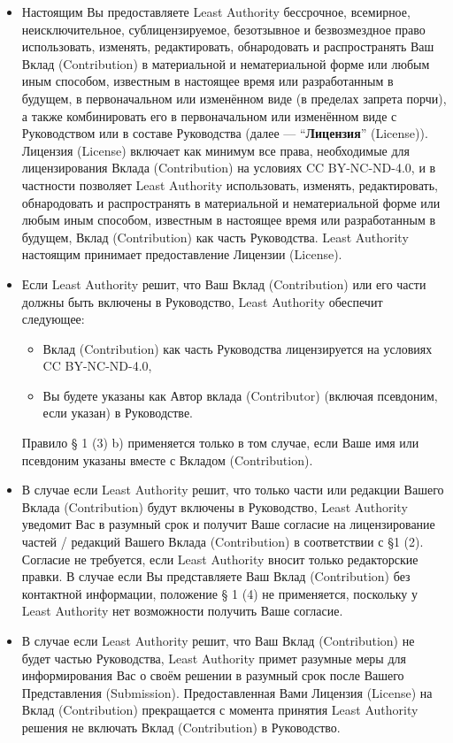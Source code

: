 \begin{itemize}
\item[(2)] Настоящим Вы предоставляете Least Authority бессрочное, всемирное, неисключительное, сублицензируемое, безотзывное и безвозмездное право использовать, изменять, редактировать, обнародовать и распространять Ваш Вклад (Contribution) в материальной и нематериальной форме или любым иным способом, известным в настоящее время или разработанным в будущем, в первоначальном или изменённом виде (в пределах запрета порчи), а также комбинировать его в первоначальном или изменённом виде с Руководством или в составе Руководства (далее --- ``\textbf{Лицензия}'' (License)). Лицензия (License) включает как минимум все права, необходимые для лицензирования Вклада (Contribution) на условиях CC BY-NC-ND-4.0, и в частности позволяет Least Authority использовать, изменять, редактировать, обнародовать и распространять в материальной и нематериальной форме или любым иным способом, известным в настоящее время или разработанным в будущем, Вклад (Contribution) как часть Руководства. Least Authority настоящим принимает предоставление Лицензии (License). 
\item[(3)] Если Least Authority решит, что Ваш Вклад (Contribution) или его части должны быть включены в Руководство, Least Authority обеспечит следующее: 
	\begin{itemize}
	\item[a)] Вклад (Contribution) как часть Руководства лицензируется на условиях CC BY-NC-ND-4.0, 
	\item[b)] Вы будете указаны как Автор вклада (Contributor) (включая псевдоним, если указан) в Руководстве. 
	\end{itemize}
Правило § 1 (3) b) применяется только в том случае, если Ваше имя или псевдоним указаны вместе с Вкладом (Contribution). 
\item[(4)] В случае если Least Authority решит, что только части или редакции Вашего Вклада (Contribution) будут включены в Руководство, Least Authority уведомит Вас в разумный срок и получит Ваше согласие на лицензирование частей / редакций Вашего Вклада (Contribution) в соответствии с §1 (2). Согласие не требуется, если Least Authority вносит только редакторские правки. В случае если Вы представляете Ваш Вклад (Contribution) без контактной информации, положение § 1 (4) не применяется, поскольку у Least Authority нет возможности получить Ваше согласие.      
\item[(5)] В случае если Least Authority решит, что Ваш Вклад (Contribution) не будет частью Руководства, Least Authority примет разумные меры для информирования Вас о своём решении в разумный срок после Вашего Представления (Submission). Предоставленная Вами Лицензия (License) на Вклад (Contribution) прекращается с момента принятия Least Authority решения не включать Вклад (Contribution) в Руководство. 
\end{itemize}

